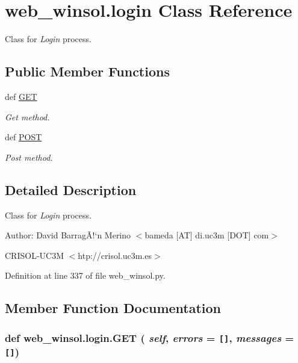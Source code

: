 \hypertarget{classweb__winsol_1_1login}{
\section{web\_\-winsol.login Class Reference}
\label{classweb__winsol_1_1login}
}
Class for {\em Login\/} process.  


\subsection*{Public Member Functions}
\begin{CompactItemize}
\item 
def \hyperlink{classweb__winsol_1_1login_b54d1a34825e0432e9357f0d83846ae9}{GET}
\begin{CompactList}\small\item\em Get method. \item\end{CompactList}\item 
def \hyperlink{classweb__winsol_1_1login_86611f380550c61c4f03662a0fb88594}{POST}
\begin{CompactList}\small\item\em Post method. \item\end{CompactList}\end{CompactItemize}


\subsection{Detailed Description}
Class for {\em Login\/} process. 

\begin{Desc}
\item[Author:]David Barrag\~{A}!`n Merino $<$bameda \mbox{[}AT\mbox{]} di.uc3m \mbox{[}DOT\mbox{]} com$>$ 

CRISOL-UC3M $<$htp://crisol.uc3m.es$>$ \end{Desc}




Definition at line 337 of file web\_\-winsol.py.

\subsection{Member Function Documentation}
\hypertarget{classweb__winsol_1_1login_b54d1a34825e0432e9357f0d83846ae9}{
\subsubsection[GET]{\setlength{\rightskip}{0pt plus 5cm}def web\_\-winsol.login.GET ( {\em self},  {\em errors} = {\tt \mbox{[}\mbox{]}},  {\em messages} = {\tt \mbox{[}\mbox{]}})}}
\label{classweb__winsol_1_1login_b54d1a34825e0432e9357f0d83846ae9}


